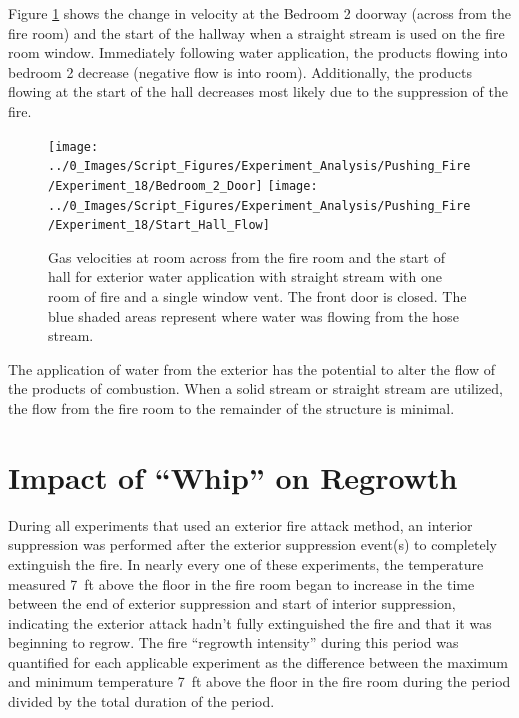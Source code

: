 \documentclass[12pt,oneside]{book}
\begin{document}
Figure \ref{fig:push_fire_SS_BR2} shows the change in velocity at the Bedroom 2 doorway (across from the fire room) and the start of the hallway when a straight stream is used on the fire room window. Immediately following water application, the products flowing into bedroom 2 decrease (negative flow is into room). Additionally, the products flowing at the start of the hall decreases most likely due to the suppression of the fire. 

\begin{figure}[H]
\centering
\texttt{[image: ../0\_Images/Script\_Figures/Experiment\_Analysis/Pushing\_Fire/Experiment\_18/Bedroom\_2\_Door]}
\texttt{[image: ../0\_Images/Script\_Figures/Experiment\_Analysis/Pushing\_Fire/Experiment\_18/Start\_Hall\_Flow]}
\caption[Gas Velocities - Single Room of Fire - Exterior Straight Stream]{Gas velocities at room across from the fire room and the start of hall for exterior water application with straight stream with one room of fire and a single window vent. The front door is closed. The blue shaded areas represent where water was flowing from the hose stream. }
\label{fig:push_fire_SS_BR2}
\end{figure}

The application of water from the exterior has the potential to alter the flow of the products of combustion. When a solid stream or straight stream are utilized, the flow from the fire room to the remainder of the structure is minimal.  

\section{Impact of ``Whip'' on Regrowth}
During all experiments that used an exterior fire attack method, an interior suppression was performed after the exterior suppression event(s) to completely extinguish the fire. In nearly every one of these experiments, the temperature measured 7~ft above the floor in the fire room began to increase in the time between the end of exterior suppression and start of interior suppression, indicating the exterior attack hadn't fully extinguished the fire and that it was beginning to regrow. The fire ``regrowth intensity'' during this period was quantified for each applicable experiment as the difference between the maximum and minimum temperature 7~ft above the floor in the fire room during the period divided by the total duration of the period.
\end{document}
